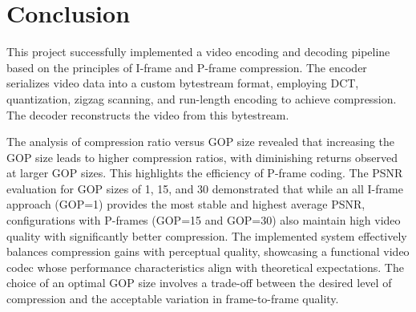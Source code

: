 \documentclass{article}
\begin{document}
\section{Conclusion}
This project successfully implemented a video encoding and decoding pipeline based on the principles of I-frame and P-frame compression. The encoder serializes video data into a custom bytestream format, employing DCT, quantization, zigzag scanning, and run-length encoding to achieve compression. The decoder reconstructs the video from this bytestream.

The analysis of compression ratio versus GOP size revealed that increasing the GOP size leads to higher compression ratios, with diminishing returns observed at larger GOP sizes. This highlights the efficiency of P-frame coding. The PSNR evaluation for GOP sizes of 1, 15, and 30 demonstrated that while an all I-frame approach (GOP=1) provides the most stable and highest average PSNR, configurations with P-frames (GOP=15 and GOP=30) also maintain high video quality with significantly better compression. The implemented system effectively balances compression gains with perceptual quality, showcasing a functional video codec whose performance characteristics align with theoretical expectations. The choice of an optimal GOP size involves a trade-off between the desired level of compression and the acceptable variation in frame-to-frame quality.
\end{document}

